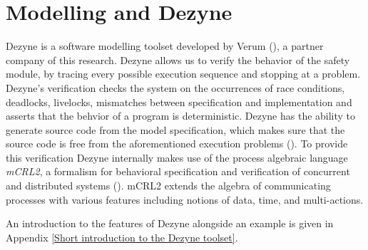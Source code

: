 \documentclass[12pt]{scrreprt}
\begin{document}
\section{Modelling and Dezyne}
\label{Modelling and Dezyne}
Dezyne is a software modelling toolset developed by Verum (\cite{verum}), a partner company of this research. Dezyne allows us to verify the behavior of the safety module, by tracing every possible execution sequence and stopping at a problem. Dezyne's verification checks the system on the occurrences of race conditions, deadlocks, livelocks, mismatches between specification and implementation and asserts that the behvior of a program is deterministic. Dezyne has the ability to generate source code from the model specification, which makes sure that the source code is free from the aforementioned execution problems (\cite{dzntut}).
To provide this verification Dezyne internally makes use of the process algebraic language \textit{mCRL2}, a formalism for behavioral specification and verification of concurrent and distributed systems (\cite{mcrl2}). mCRL2 extends the algebra of communicating processes with various features including notions of data, time, and multi-actions.
\par
An introduction to the features of Dezyne alongside an example is given in Appendix \ref{Short introduction to the Dezyne toolset}.
\end{document}
